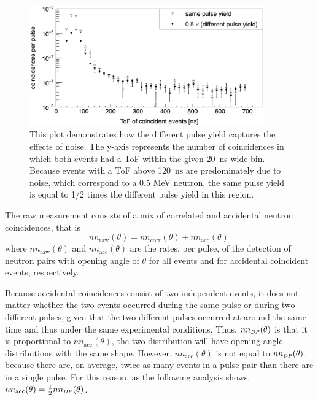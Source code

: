 \begin{figure}[]
\centering
    \includegraphics[width=0.9\textwidth]{Content/Methods/NoiseSubtraction.png}
    \caption{This plot demonstrates how the different pulse yield captures the effects of noise.
    The y-axis represents the number of coincidences in which both events had a ToF within the given 20~ns wide bin.
    Because events with a ToF above 120~ns are predominately due to noise, which correspond to a 0.5 MeV neutron, the same pulse yield is equal to 1/2 times the different pulse yield in this region.
    }
    \label{noise_siubtraction}
\end{figure}

The raw measurement consists of a mix of correlated and accidental neutron coincidences, that is
\begin{equation}
\label{eq:corr_uncorr}
nn_{\text{raw}}(\theta)= nn_{\text{corr}}(\theta) + nn_{\text{acc}}(\theta) \,
\end{equation}
where $nn_{\text{raw}}(\theta)$ and $nn_{\text{acc}}(\theta)$ are the rates, per pulse, of the detection of neutron pairs with opening angle of $\theta$ for all events and for accidental coincident events, respectively.

Because accidental coincidences consist of two independent events, it does not matter whether the two events occurred during the same pulse or during two different pulses, given that the two different pulses occurred at around the same time and thus under the same experimental conditions.
Thus, $nn_{\scaleto{DP}{4pt}}(\theta)$ is that it is proportional to $nn_{\text{acc}}(\theta)$, the two distribution will have opening angle distributions with the same shape.
However, $nn_{\text{acc}}(\theta)$ is not equal to $nn_{\scaleto{DP}{4pt}}(\theta)$, because there are, on average, twice as many events in a pulse-pair than there are in a single pulse.
For this reason, as the following analysis shows,~$nn_{\text{acc}}(\theta) = \frac{1}{2}nn_{\scaleto{DP}{4pt}}(\theta)$.

